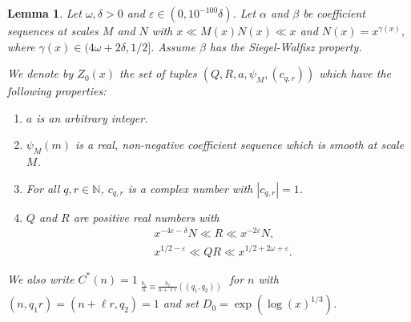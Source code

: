 \documentclass{amsart}
\newtheorem{lemma}{Lemma}
\numberwithin{equation}{section}
\begin{document}
\begin{lemma}\label{lem:PolymathSection5}
Let $\omega, \delta >0$ and $\varepsilon  \in (0, 10^{-100} \delta)$. Let $\alpha$ and $\beta$ be coefficient sequences at scales $M$ and $N$ with $x \ll M(x)N(x) \ll x$ and $N(x)= x^{\gamma(x)}$, where $\gamma(x) \in (4\omega+2\delta,1/2]$.    Assume $\beta$ has the Siegel-Walfisz property. 

\vspace{3mm} We denote by $Z_0(x)$ the set of tuples  $(Q,R,a,\psi_M,(c_{q,r}) )$ which have the following properties:
\begin{enumerate}[{\rm (i)}]
\item $a$ is an arbitrary integer.
\item  $\psi_M(m)$ is a real, non-negative coefficient sequence  which is smooth at scale $M$.
\item For all $q,r \in \mathbb{N}$, $c_{q,r}$ is a complex number with $|c_{q,r}|=1$.
\item  $Q$ and $R$ are positive real numbers with
\begin{align} 
&x^{-4\varepsilon-\delta}N \ll R \ll x^{-2\varepsilon}N, \label{appendix:R}\\
&x^{1/2-\varepsilon} \ll QR \ll x^{1/2+2\omega+\varepsilon}.  \label{appendix:Q}
\end{align}
\end{enumerate}
We also write $C^*(n) = 1_{\substack{\frac{b_1}{n}  \equiv \frac{b_2}{n+\ell r} ((q_1,q_2))}}
$ for $n$ with  $(n,q_1 r) = (n+\ell r, q_2)=1$  
 and  set $D_0 = \exp(\log(x)^{1/3})$. 



\end{lemma}
\end{document}
